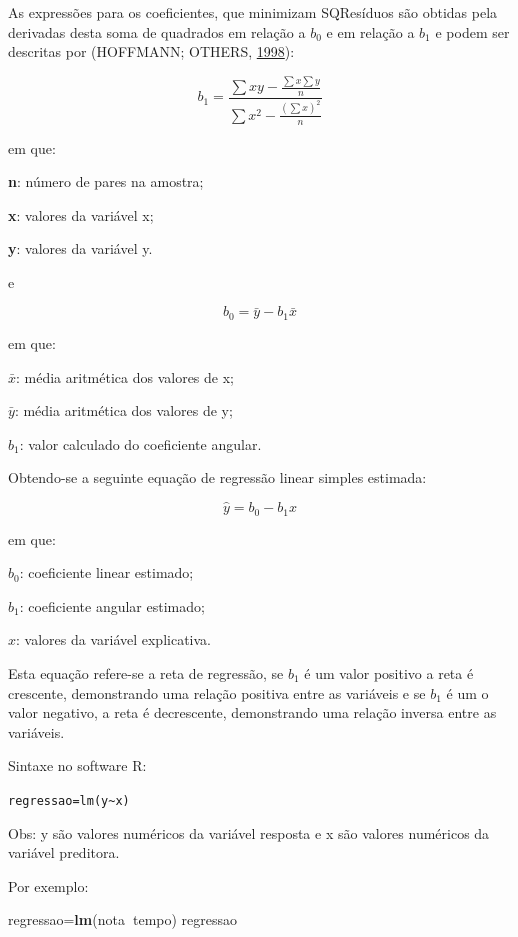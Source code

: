 \documentclass[12pt,portuguese,oneside]{book}
\newenvironment{Shaded}{\begin{snugshade}}{\end{snugshade}}
\newcommand{\KeywordTok}[1]{\textcolor[rgb]{0.13,0.29,0.53}{\textbf{#1}}}
\newcommand{\OperatorTok}[1]{\textcolor[rgb]{0.81,0.36,0.00}{\textbf{#1}}}
\newcommand{\NormalTok}[1]{#1}
\begin{document}
As expressões para os coeficientes, que minimizam SQResíduos são obtidas
pela derivadas desta soma de quadrados em relação a \(b_0\) e em relação
a \(b_1\) e podem ser descritas por (HOFFMANN; OTHERS,
\protect\hyperlink{ref-hoffmann1998}{1998}):

\[
b_1=\frac{\sum xy-\frac{\sum x \sum y}{n}}{\sum x^2 - \frac{(\sum x)^2}{n}}
\]

em que:

\textbf{n}: número de pares na amostra;

\textbf{x}: valores da variável x;

\textbf{y}: valores da variável y.

e

\[
b_0=\bar{y}-b_1\bar{x}
\]

em que:

\(\bar{x}\): média aritmética dos valores de x;

\(\bar{y}\): média aritmética dos valores de y;

\(b_1\): valor calculado do coeficiente angular.

Obtendo-se a seguinte equação de regressão linear simples estimada:

\[
\hat{y}=b_0-b_1{x}
\]

em que:

\(b_0\): coeficiente linear estimado;

\(b_1\): coeficiente angular estimado;

\(x\): valores da variável explicativa.

Esta equação refere-se a reta de regressão, se \(b_1\) é um valor
positivo a reta é crescente, demonstrando uma relação positiva entre as
variáveis e se \(b_1\) é um o valor negativo, a reta é decrescente,
demonstrando uma relação inversa entre as variáveis.

Sintaxe no software R:

\texttt{regressao=lm(y\textasciitilde{}x)}

Obs: y são valores numéricos da variável resposta e x são valores
numéricos da variável preditora.

Por exemplo:

\begin{Shaded}
\begin{Highlighting}[]
\NormalTok{regressao=}\KeywordTok{lm}\NormalTok{(nota}\OperatorTok{~}\NormalTok{tempo)}
\NormalTok{regressao}
\end{Highlighting}
\end{Shaded}
\end{document}
